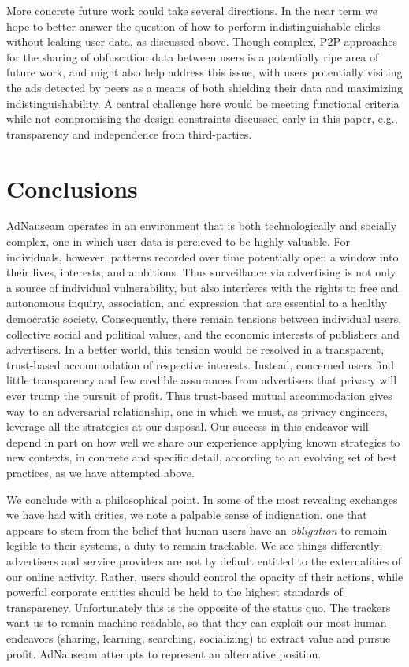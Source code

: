 \documentclass[conference]{IEEEtran}
\begin{document}
More concrete future work could take several directions. In the near term we hope to better answer the question of how to perform indistinguishable clicks without leaking user data, as discussed above. Though complex, P2P approaches for the sharing of obfuscation data between users is a potentially ripe area of future work, and might also help address this issue, with users potentially visiting the ads detected by peers as a means of both shielding their data and maximizing indistinguishability. A central challenge here would be meeting functional criteria while not compromising the design constraints discussed early in this paper, e.g., transparency and independence from third-parties.

\section{Conclusions}

AdNauseam operates in an environment that is both technologically and socially complex, one in which user data is percieved to be highly valuable. For individuals, however, patterns recorded over time potentially open a window into their lives, interests, and ambitions. Thus surveillance via advertising is not only a source of individual vulnerability, but also interferes with the rights to free and autonomous inquiry, association, and expression that are essential to a healthy democratic society. Consequently, there remain tensions between individual users, collective social and political values, and the economic interests of publishers and advertisers. In a better world, this tension would be resolved in a transparent, trust-based accommodation of respective interests. Instead, concerned users find little transparency and few credible assurances from advertisers that privacy will ever trump the pursuit of profit. Thus trust-based mutual accommodation gives way to an adversarial relationship, one in which we must, as privacy engineers, leverage all the strategies at our disposal. Our success in this endeavor will depend in part on how well we share our experience applying known strategies to new contexts, in concrete and specific detail, according to an evolving set of best practices, as we have attempted above.

We conclude with a philosophical point. In some of the most revealing exchanges we have had with critics, we note a palpable sense of indignation, one that appears to stem from the belief that human users have an \emph{obligation} to remain legible to their systems, a duty to remain trackable. We see things differently; advertisers and service providers are not by default entitled to the externalities of our online activity. Rather, users should control the opacity of their actions, while powerful corporate entities should be held to the highest standards of transparency. Unfortunately this is the opposite of the status quo. The trackers want us to remain machine-readable, so that they can exploit our most human endeavors (sharing, learning, searching, socializing) to extract value and pursue profit. AdNauseam attempts to represent an alternative position.
\end{document}
